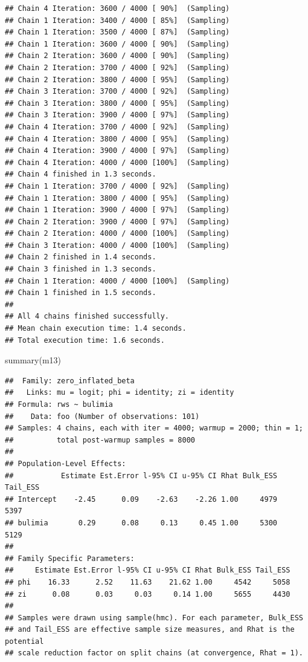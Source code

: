 \documentclass[
]{article}
\newenvironment{Shaded}{\begin{snugshade}}{\end{snugshade}}
\newcommand{\FunctionTok}[1]{\textcolor[rgb]{0.00,0.00,0.00}{#1}}
\newcommand{\NormalTok}[1]{#1}
\begin{document}
\begin{verbatim}
## Chain 4 Iteration: 3600 / 4000 [ 90%]  (Sampling) 
## Chain 1 Iteration: 3400 / 4000 [ 85%]  (Sampling) 
## Chain 1 Iteration: 3500 / 4000 [ 87%]  (Sampling) 
## Chain 1 Iteration: 3600 / 4000 [ 90%]  (Sampling) 
## Chain 2 Iteration: 3600 / 4000 [ 90%]  (Sampling) 
## Chain 2 Iteration: 3700 / 4000 [ 92%]  (Sampling) 
## Chain 2 Iteration: 3800 / 4000 [ 95%]  (Sampling) 
## Chain 3 Iteration: 3700 / 4000 [ 92%]  (Sampling) 
## Chain 3 Iteration: 3800 / 4000 [ 95%]  (Sampling) 
## Chain 3 Iteration: 3900 / 4000 [ 97%]  (Sampling) 
## Chain 4 Iteration: 3700 / 4000 [ 92%]  (Sampling) 
## Chain 4 Iteration: 3800 / 4000 [ 95%]  (Sampling) 
## Chain 4 Iteration: 3900 / 4000 [ 97%]  (Sampling) 
## Chain 4 Iteration: 4000 / 4000 [100%]  (Sampling) 
## Chain 4 finished in 1.3 seconds.
## Chain 1 Iteration: 3700 / 4000 [ 92%]  (Sampling) 
## Chain 1 Iteration: 3800 / 4000 [ 95%]  (Sampling) 
## Chain 1 Iteration: 3900 / 4000 [ 97%]  (Sampling) 
## Chain 2 Iteration: 3900 / 4000 [ 97%]  (Sampling) 
## Chain 2 Iteration: 4000 / 4000 [100%]  (Sampling) 
## Chain 3 Iteration: 4000 / 4000 [100%]  (Sampling) 
## Chain 2 finished in 1.4 seconds.
## Chain 3 finished in 1.3 seconds.
## Chain 1 Iteration: 4000 / 4000 [100%]  (Sampling) 
## Chain 1 finished in 1.5 seconds.
## 
## All 4 chains finished successfully.
## Mean chain execution time: 1.4 seconds.
## Total execution time: 1.6 seconds.
\end{verbatim}

\begin{Shaded}
\begin{Highlighting}[]
\FunctionTok{summary}\NormalTok{(m13)}
\end{Highlighting}
\end{Shaded}

\begin{verbatim}
##  Family: zero_inflated_beta 
##   Links: mu = logit; phi = identity; zi = identity 
## Formula: rws ~ bulimia 
##    Data: foo (Number of observations: 101) 
## Samples: 4 chains, each with iter = 4000; warmup = 2000; thin = 1;
##          total post-warmup samples = 8000
## 
## Population-Level Effects: 
##           Estimate Est.Error l-95% CI u-95% CI Rhat Bulk_ESS Tail_ESS
## Intercept    -2.45      0.09    -2.63    -2.26 1.00     4979     5397
## bulimia       0.29      0.08     0.13     0.45 1.00     5300     5129
## 
## Family Specific Parameters: 
##     Estimate Est.Error l-95% CI u-95% CI Rhat Bulk_ESS Tail_ESS
## phi    16.33      2.52    11.63    21.62 1.00     4542     5058
## zi      0.08      0.03     0.03     0.14 1.00     5655     4430
## 
## Samples were drawn using sample(hmc). For each parameter, Bulk_ESS
## and Tail_ESS are effective sample size measures, and Rhat is the potential
## scale reduction factor on split chains (at convergence, Rhat = 1).
\end{verbatim}
\end{document}
